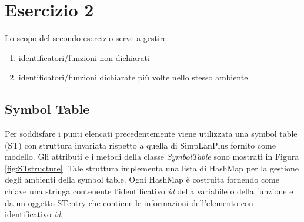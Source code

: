 \section{Esercizio 2}
Lo scopo del secondo esercizio serve a gestire:
\begin{enumerate}
\item  identificatori/funzioni non dichiarati
\item  identificatori/funzioni dichiarate più volte nello stesso ambiente
\end{enumerate}

\subsection{Symbol Table}
\label{sec:symboltable}
Per soddisfare i punti elencati precedentemente viene utilizzata una symbol table (ST) con struttura invariata rispetto a quella di SimpLanPlus fornito come modello. Gli attributi e i metodi della classe \textit{SymbolTable} sono mostrati in Figura \ref{fig:STstructure}. Tale struttura implementa una lista di HashMap per la gestione degli ambienti della symbol table. Ogni HashMap è costruita fornendo come chiave una stringa contenente l'identificativo \textit{id} della variabile o della funzione e da un oggetto STentry che contiene le informazioni dell'elemento con identificativo \textit{id}. 

